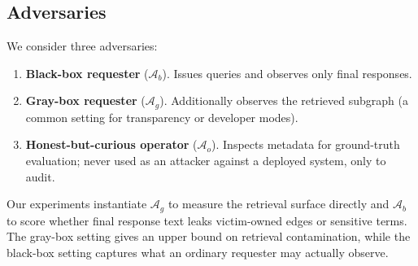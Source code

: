 \documentclass[journal,10pt,twocolumn]{IEEEtran}
\begin{document}
\subsection{Adversaries}
We consider three adversaries:
\begin{enumerate}
    \item \textbf{Black-box requester} ($\mathcal{A}_b$). Issues queries
    and observes only final responses.
    \item \textbf{Gray-box requester} ($\mathcal{A}_g$). Additionally
    observes the retrieved subgraph (a common setting for transparency
    or developer modes).
    \item \textbf{Honest-but-curious operator} ($\mathcal{A}_o$).
    Inspects metadata for ground-truth evaluation; never used as an
    attacker against a deployed system, only to audit.
\end{enumerate}
Our experiments instantiate $\mathcal{A}_g$ to measure the retrieval
surface directly and $\mathcal{A}_b$ to score whether final response
text leaks victim-owned edges or sensitive terms. The gray-box setting
gives an upper bound on retrieval contamination, while the black-box
setting captures what an ordinary requester may actually observe.
\end{document}
